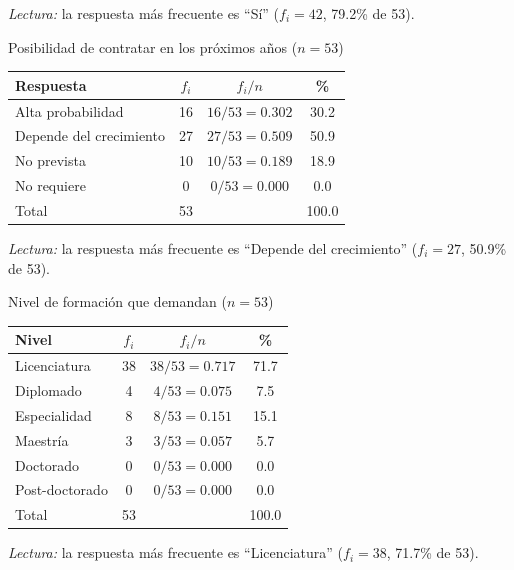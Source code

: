 \textit{Lectura:} la respuesta más frecuente es ``Sí'' ($f_i = 42$, 79.2\% de 53).

\begin{mitabla}{Posibilidad de contratar en los próximos años ($n=53$)}
\begin{tabular}{lccc}
\toprule
Respuesta & $f_i$ & $f_i / n$ & \% \\
\midrule
Alta probabilidad & 16 & $16/53 = 0.302$ & 30.2 \\
Depende del crecimiento & 27 & $27/53 = 0.509$ & 50.9 \\
No prevista & 10 & $10/53 = 0.189$ & 18.9 \\
No requiere & 0 & $0/53 = 0.000$ & 0.0 \\
\midrule
Total & 53 & & 100.0 \\
\bottomrule
\end{tabular}
\end{mitabla}

\textit{Lectura:} la respuesta más frecuente es ``Depende del crecimiento'' ($f_i = 27$, 50.9\% de 53).

\begin{mitabla}{Nivel de formación que demandan ($n=53$)}
\begin{tabular}{lccc}
\toprule
Nivel & $f_i$ & $f_i / n$ & \% \\
\midrule
Licenciatura & 38 & $38/53 = 0.717$ & 71.7 \\
Diplomado & 4 & $4/53 = 0.075$ & 7.5 \\
Especialidad & 8 & $8/53 = 0.151$ & 15.1 \\
Maestría & 3 & $3/53 = 0.057$ & 5.7 \\
Doctorado & 0 & $0/53 = 0.000$ & 0.0 \\
Post-doctorado & 0 & $0/53 = 0.000$ & 0.0 \\
\midrule
Total & 53 & & 100.0 \\
\bottomrule
\end{tabular}
\end{mitabla}

\textit{Lectura:} la respuesta más frecuente es ``Licenciatura'' ($f_i = 38$, 71.7\% de 53).

